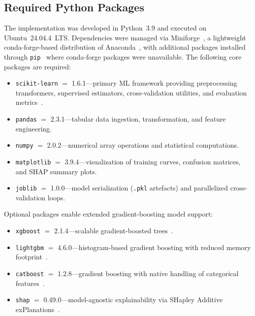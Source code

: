 \documentclass[diagnostics,article,accept,pdftex,moreauthors]{Definitions/mdpi}
\begin{document}
\subsection[\appendixname~\thesubsection]{Required Python Packages}
The implementation was developed in Python~3.9 and executed on Ubuntu~24.04.4~LTS.
Dependencies were managed via Miniforge~\cite{miniforge2021}, a lightweight
conda-forge-based distribution of Anaconda~\cite{anaconda2020package}, with additional
packages installed through \texttt{pip}~\cite{pip_pypa} where conda-forge
packages were unavailable. The following core packages are required:
\begin{itemize}
    \item \texttt{scikit-learn} $=$ {1.6.1}—primary \ac{ML}
      framework providing preprocessing transformers, supervised
      estimators, cross-validation utilities, and evaluation
      metrics~\cite{sklearn-api}. %
    \item \texttt{pandas} $=$ 2.3.1—tabular data ingestion, transformation, and feature engineering.
    \item \texttt{numpy} $=$ 2.0.2—numerical array operations and statistical computations.
    \item \texttt{matplotlib} $=$ 3.9.4—visualization of training curves, confusion matrices, and \ac{SHAP} summary plots.
    \item \texttt{joblib} $=$ 1.0.0—model serialization (\texttt{.pkl} artefacts) and parallelized cross-validation loops.
\end{itemize}
Optional packages enable extended gradient-boosting model support:
\begin{itemize}
    \item \texttt{xgboost} $=$ 2.1.4—scalable gradient-boosted trees~\cite{chen2016xgboost}.
    \item \texttt{lightgbm} $=$ 4.6.0—histogram-based gradient boosting with reduced memory footprint~\cite{ke2017lightgbm}.
    \item \texttt{catboost} $=$ 1.2.8—gradient boosting with native handling of categorical features~\cite{prokhorenkova2018catboost}.
    \item \texttt{shap} $=$ 0.49.0—model-agnostic explainability via SHapley Additive exPlanations~\cite{lundberg2017shap}.
\end{itemize}


\end{document}
